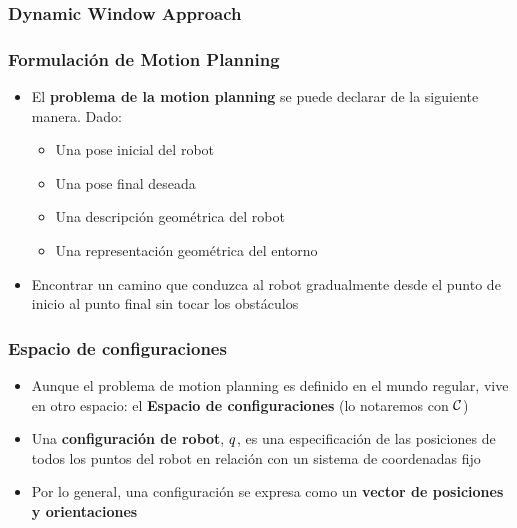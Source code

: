\begin{frame}
    \frametitle{Dynamic Window Approach}
    
    
    
    
\end{frame}


\begin{frame}
	\frametitle{Formulación de Motion Planning}

	\begin{itemize}
		\item El {\bf problema de la motion planning} se puede declarar de la siguiente manera. Dado:
		\begin{itemize}
			\item Una pose inicial del robot
			\item Una pose final deseada
			\item Una descripción geométrica del robot
			\item Una representación geométrica del entorno
		\end{itemize}
		\item Encontrar un camino que conduzca al robot gradualmente desde el punto de inicio al punto final sin tocar los obstáculos
	\end{itemize}
\end{frame}

\begin{frame}
	\frametitle{Espacio de configuraciones}
	
	\begin{itemize}
		\item Aunque el problema de motion planning es definido en el mundo regular, vive en otro espacio: el {\bf Espacio de configuraciones} (lo notaremos con $\mathcal{C}$)
		\item Una {\bf configuración de robot}, $q$, es una especificación de las posiciones de todos los puntos del robot en relación con un sistema de coordenadas fijo
		\item Por lo general, una configuración se expresa como un {\bf vector de posiciones y orientaciones}
	\end{itemize}

	
\end{frame}

